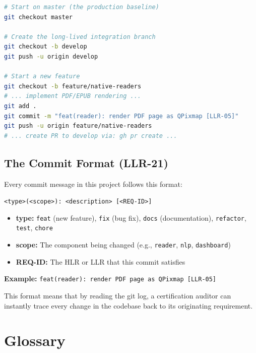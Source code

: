 \documentclass[12pt,oneside]{book}
\begin{document}
\begin{lstlisting}[language=bash, caption={Setting up the GitFlow branch structure}]
# Start on master (the production baseline)
git checkout master

# Create the long-lived integration branch
git checkout -b develop
git push -u origin develop

# Start a new feature
git checkout -b feature/native-readers
# ... implement PDF/EPUB rendering ...
git add .
git commit -m "feat(reader): render PDF page as QPixmap [LLR-05]"
git push -u origin feature/native-readers
# ... create PR to develop via: gh pr create ...
\end{lstlisting}

\section{The Commit Format (LLR-21)}

Every commit message in this project follows this format:

\begin{center}
\texttt{<type>(<scope>): <description> [<REQ-ID>]}
\end{center}

\begin{itemize}
  \item \textbf{type:} \texttt{feat} (new feature), \texttt{fix} (bug fix),
    \texttt{docs} (documentation), \texttt{refactor}, \texttt{test}, \texttt{chore}
  \item \textbf{scope:} The component being changed (e.g., \texttt{reader},
    \texttt{nlp}, \texttt{dashboard})
  \item \textbf{REQ-ID:} The HLR or LLR that this commit satisfies
\end{itemize}

\textbf{Example:} \texttt{feat(reader): render PDF page as QPixmap [LLR-05]}

This format means that by reading the git log, a certification auditor can instantly
trace every change in the codebase back to its originating requirement.

\backmatter

\chapter*{Glossary}
\end{document}
